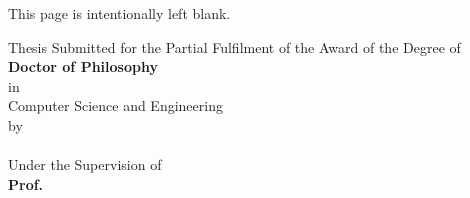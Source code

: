 \documentclass[12pt,a4paper,openright,notitlepage]{extreport}
\begin{document}
\bibliographyunit[\chapter]

\begin{titlepage}
\null
\begin{center}
\LARGE\textbf{\thesistitle}
\end{center}

\vfill
\vfill

\begin{flushright}
\Large \myname
\end{flushright}
\end{titlepage}

\thispagestyle{empty}
\newpage
\mbox{}
\vspace{\fill}
\begin{center}
    This page is intentionally left blank.
\end{center}
\thispagestyle{empty}
\newpage
\begin{center}
    \LARGE\textbf{\thesistitle}
\end{center}
\vspace{20px}
\begin{center}
	Thesis Submitted for the Partial Fulfilment of the Award of the Degree of\\
	{\large\textbf{Doctor of Philosophy}}\\
        in\\
	Computer Science and Engineering\\
	by\\
    \vspace{20px}
	{\large\textbf{\myname}}\\
    \vspace{20px}
	Under the Supervision of\\
    \vspace{5px}
	{\large\textbf{Prof. \supervisorname}}
\end{center}
\end{document}
